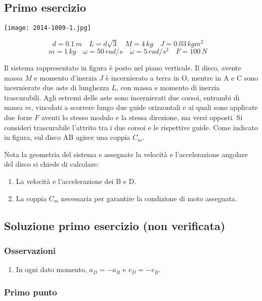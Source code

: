 \documentclass[main.tex]{subfiles}
\begin{document}
\subsection{Primo esercizio}

\texttt{[image: 2014-1009-1.jpg]}

\[
	d =0.1\,m \quad
	L = d\sqrt{3} \quad
	M = 4\,kg \quad
	J = 0.03\,kgm^2 \quad
\]
\[
	m = 1\,kg \quad
	\omega = 50\,rad/s  \quad
	\dot{\omega} = 5\,rad/s^2 \quad
	F = 100\,N \quad
\]

Il sistema rappresentato in figura è posto nel piano verticale. Il disco, avente massa $M$ e momento d'inerzia $J$ è incernierato a terra in O, mentre in A e C sono incernierate due aste di lunghezza $L$, con massa e momento di inerzia trascurabili. Agli estremi delle aste sono incernierati due corsoi, entrambi di massa $m$, vincolati a scorrere lungo due guide orizzontali e ai quali sono applicate due forze $F$ aventi lo stesso modulo e la stessa direzione, ma versi opposti. Si consideri trascurabile l’attrito tra i due corsoi e le rispettive guide. Come indicato in figura, sul disco AB agisce una coppia $C_m$.

Nota la geometria del sistema e assegnate la velocità e l’accelerazione angolare del disco si chiede di calcolare:

\begin{enumerate}
\item La velocità e l'accelerazione dei B e D.
\item La coppia $C_m$ necessaria per garantire la condizione di moto assegnata.
\end{enumerate}

\clearpage

\subsection{Soluzione primo esercizio (non verificata)}

\subsubsection{Osservazioni}

\begin{enumerate}
\item In ogni dato momento, $a_D = -a_B$ e $v_D = -v_B$.
\end{enumerate}

\subsubsection{Primo punto}
\end{document}
